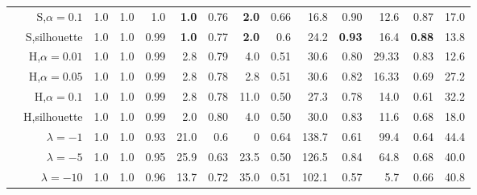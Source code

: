 \begin{table*}
\begin{center}
{\begin{tabular}[th]{@{}lrrrrrrrrrrrrr@{}}
                                                                                    & S,$\alpha=0.1$    & 1.0  & 1.0        & 1.0 & \textbf{1.0}         & 0.76 & \textbf{2.0}          & 0.66 & 16.8                & 0.90 & 12.6       & 0.87 & 17.0 \\

                                                                                    & S,silhouette      & 1.0  & 1.0        & 0.99 & \textbf{1.0}        & 0.77 & \textbf{2.0}          & 0.6  & 24.2                & \textbf{0.93} & 16.4       & \textbf{0.88} & 13.8\\

                                                                                    & H,$\alpha=0.01$   & 1.0  & 1.0        & 0.99 & 2.8                 & 0.79 & 4.0                   & 0.51 & 30.6                & 0.80 & 29.33      & 0.83 & 12.6 \\

                                                                                    & H,$\alpha=0.05$   & 1.0  & 1.0        & 0.99 & 2.8                 & 0.78 & 2.8                   & 0.51 & 30.6                & 0.82 & 16.33      & 0.69 & 27.2 \\

                                                                                    & H,$\alpha=0.1$    & 1.0  & 1.0        & 0.99 & 2.8                 & 0.78 & 11.0                  & 0.50 & 27.3                & 0.78 & 14.0       & 0.61 & 32.2   \\

                                                                                    & H,silhouette      & 1.0  & 1.0        & 0.99 & 2.0                 & 0.80 & 4.0                   & 0.50 & 30.0                & 0.83 & 11.6       & 0.68 & 18.0  \\
                \midrule
        \parbox[t]{2mm}{}    & $\lambda=-1$      & 1.0  & 1.0       & 0.93 & 21.0        & 0.6  & 0          & 0.64 & 138.7      &  0.61 & 99.4        &0.64 & 44.4 \\

                                                                                    & $\lambda=-5$      & 1.0  & 1.0       & 0.95 & 25.9        & 0.63  & 23.5      & 0.50 & 126.5        & 0.84 & 64.8       &0.68 & 40.0 \\

                                                                                    & $\lambda=-10$     & 1.0  & 1.0       & 0.96 & 13.7        & 0.72  & 35.0      & 0.51 & 102.1        & 0.57 & 5.7         &0.66 & 40.8 \\
                \bottomrule



        \end{tabular}
        }
        \label{tab:Results}
    \end{center}
\end{table*}



